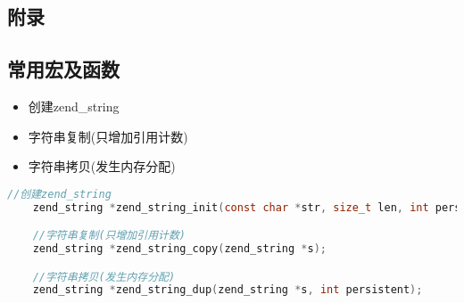 \begin{appendices}
\chapter{附录}
\section{常用宏及函数}

\begin{itemize}
    \item {}     创建zend\_string
    \item {}     字符串复制(只增加引用计数)  
    \item {}      字符串拷贝(发生内存分配)
\end{itemize}

\begin{lstlisting}[language=c]
    //创建zend_string
    zend_string *zend_string_init(const char *str, size_t len, int persistent); 

    //字符串复制(只增加引用计数)
    zend_string *zend_string_copy(zend_string *s);

    //字符串拷贝(发生内存分配)
    zend_string *zend_string_dup(zend_string *s, int persistent);
\end{lstlisting}  
\end{appendices}  